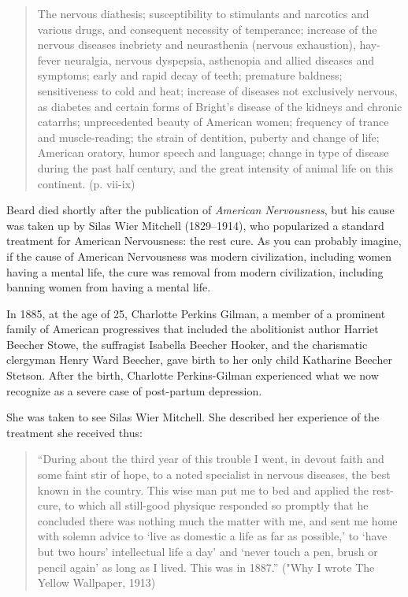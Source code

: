 \begin{quote}

The nervous diathesis; susceptibility to stimulants and narcotics and various drugs, and consequent necessity of temperance; increase of the nervous diseases inebriety and neurasthenia (nervous exhaustion), hay-fever neuralgia, nervous dyspepsia, asthenopia and allied diseases and symptoms; early and rapid decay of teeth; premature baldness; sensitiveness to cold and heat; increase of diseases not exclusively nervous, as diabetes and certain forms of Bright's disease of the kidneys and chronic catarrhs; unprecedented beauty of American women; frequency of trance and muscle-reading; the strain of dentition, puberty and change of life; American oratory, humor speech and language; change in type of disease during the past half century, and the great intensity of animal life on this continent. (p. vii-ix)
\end{quote}

Beard died shortly after the publication of \emph{American Nervousness}, but his cause was taken up by Silas Wier Mitchell (1829--1914), who popularized a standard treatment for American Nervousness: the rest cure. As you can probably imagine, if the cause of American Nervousness was modern civilization, including women having a mental life, the cure was removal from modern civilization, including banning women from having a mental life.

In 1885, at the age of 25, Charlotte Perkins Gilman, a member of a prominent family of American progressives that included the abolitionist author Harriet Beecher Stowe, the suffragist Isabella Beecher Hooker, and the charismatic clergyman Henry Ward Beecher, gave birth to her only child Katharine Beecher Stetson. After the birth, Charlotte Perkins-Gilman experienced what we now recognize as a severe case of post-partum depression.

She was taken to see Silas Wier Mitchell. She described her experience of the treatment she received thus:

\begin{quote}

``During about the third year of this trouble I went, in devout faith and some faint stir of hope, to a noted specialist in nervous diseases, the best known in the country. This wise man put me to bed and applied the rest-cure, to which all still-good physique responded so promptly that he concluded there was nothing much the matter with me, and sent me home with solemn advice to `live as domestic a life as far as possible,' to `have but two hours' intellectual life a day' and `never touch a pen, brush or pencil again' as long as I lived. This was in 1887.'' ("Why I wrote The Yellow Wallpaper, 1913)
\end{quote}

